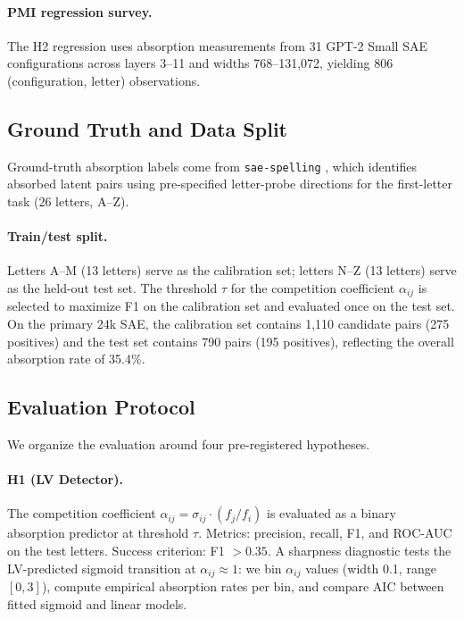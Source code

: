 \documentclass{article}
\begin{document}
\paragraph{PMI regression survey.} The H2 regression uses absorption measurements from 31 GPT-2 Small SAE configurations across layers 3--11 and widths 768--131,072, yielding 806 (configuration, letter) observations.

\subsection{Ground Truth and Data Split}
\label{sec:data_split}

Ground-truth absorption labels come from \texttt{sae-spelling} \citep{chanin2024absorption}, which identifies absorbed latent pairs using pre-specified letter-probe directions for the first-letter task (26 letters, A--Z).

\paragraph{Train/test split.} Letters A--M (13 letters) serve as the calibration set; letters N--Z (13 letters) serve as the held-out test set. The threshold $\tau$ for the competition coefficient $\alpha_{ij}$ is selected to maximize F1 on the calibration set and evaluated once on the test set. On the primary 24k SAE, the calibration set contains 1,110 candidate pairs (275 positives) and the test set contains 790 pairs (195 positives), reflecting the overall absorption rate of 35.4\%.

\subsection{Evaluation Protocol}
\label{sec:eval_protocol}

We organize the evaluation around four pre-registered hypotheses.

\paragraph{H1 (LV Detector).} The competition coefficient $\alpha_{ij} = \sigma_{ij} \cdot (f_j / f_i)$ is evaluated as a binary absorption predictor at threshold $\tau$. Metrics: precision, recall, F1, and ROC-AUC on the test letters. Success criterion: F1 $> 0.35$. A sharpness diagnostic tests the LV-predicted sigmoid transition at $\alpha_{ij} \approx 1$: we bin $\alpha_{ij}$ values (width 0.1, range $[0, 3]$), compute empirical absorption rates per bin, and compare AIC between fitted sigmoid and linear models.
\end{document}
